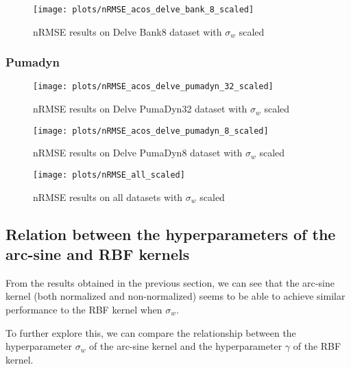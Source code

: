 \begin{figure}[H]
    \texttt{[image: plots/nRMSE\_acos\_delve\_bank\_8\_scaled]}
    \caption{nRMSE results on Delve Bank8 dataset with $\sigma_w$ scaled}
    \label{fig:nrmse-acos-delve-bank-8-scaled}
\end{figure}

\subsubsection{Pumadyn}

\begin{figure}[H]
    \texttt{[image: plots/nRMSE\_acos\_delve\_pumadyn\_32\_scaled]}
    \caption{nRMSE results on Delve PumaDyn32 dataset with $\sigma_w$ scaled}
    \label{fig:nrmse-acos-delve-pumadyn-32-scaled}
\end{figure}

\begin{figure}[H]
    \texttt{[image: plots/nRMSE\_acos\_delve\_pumadyn\_8\_scaled]}
    \caption{nRMSE results on Delve PumaDyn8 dataset with $\sigma_w$ scaled}
    \label{fig:nrmse-acos-delve-pumadyn-8-scaled}
\end{figure}

\begin{figure}[H]
    \texttt{[image: plots/nRMSE\_all\_scaled]}
    \caption{nRMSE results on all datasets with $\sigma_w$ scaled}
    \label{fig:nrmse-all-scaled}
\end{figure}

\subsection{Relation between the hyperparameters of the arc-sine and RBF kernels}


From the results obtained in the previous section, we can see that the
arc-sine kernel (both normalized and non-normalized) seems to be able
to achieve similar performance to the RBF kernel when $\sigma_w$.

To further explore this, we can compare the relationship between the hyperparameter
$\sigma_w$ of the arc-sine kernel and the hyperparameter $\gamma$ of the RBF
kernel.


